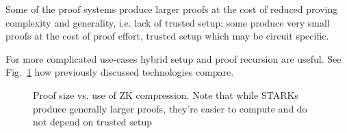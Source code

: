 \documentclass{llncs}
\begin{document}
Some of the proof systems produce larger proofs at the cost of reduced proving complexity and generality, i.e. lack of trusted setup; some produce very small proofs at the cost of proof effort, trusted setup which may be circuit specific.

For more complicated use-cases hybrid setup and proof recursion are useful. See Fig.~\ref{fig:comp} how previously discussed technologies compare.

\begin{figure}[!htbp]
    \begin{center}


    \caption{Proof size vs. use of ZK compression. Note that while STARKs produce generally larger proofs, they're easier to compute and do not depend on trusted setup}\label{fig:comp}
    \end{center}
\end{figure}





\end{document}
